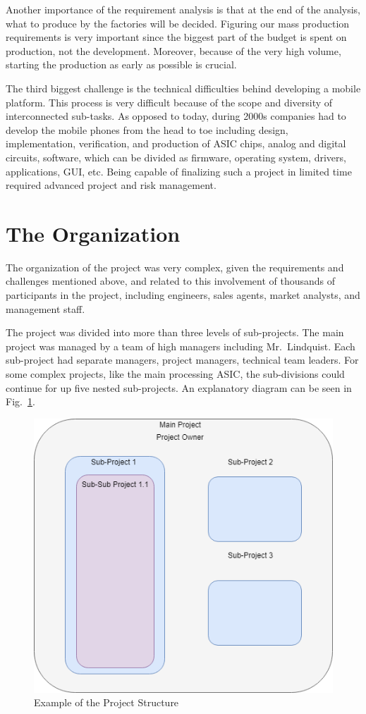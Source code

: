 \documentclass[journal]{IEEEtran}
\begin{document}
Another importance of the requirement analysis is that at the end of the analysis, what to produce by the factories will be decided. Figuring our mass production requirements is very important since the biggest part of the budget is spent on production, not the development. Moreover, because of the very high volume, starting the production as early as possible is crucial. 

The third biggest challenge is the technical difficulties behind developing a mobile platform. This process is very difficult because of the scope and diversity of interconnected sub-tasks. As opposed to today, during 2000s companies had to develop the mobile phones from the head to toe including design, implementation, verification, and production of ASIC chips, analog and digital circuits, software, which can be divided as firmware, operating system, drivers, applications, GUI, etc. Being capable of finalizing such a project in limited time required advanced project and risk management. 

\section{The Organization}
The organization of the project was very complex, given the requirements and challenges mentioned above, and related to this involvement of thousands of participants in the project, including engineers, sales agents, market analysts, and management staff. 

The project was divided into more than three levels of sub-projects. The main project was managed by a team of high managers including Mr.~Lindquist. Each sub-project had separate managers, project managers, technical team leaders. For some complex projects, like the main processing ASIC, the sub-divisions could continue for up five nested sub-projects. An explanatory diagram can be seen in Fig.~\ref{fig:project_structure}.

\begin{figure}[h]
    \centering
    \includegraphics[width=0.8\linewidth]{project_structure.png}
    \caption{Example of the Project Structure}
    \label{fig:project_structure}
\end{figure}
\end{document}
